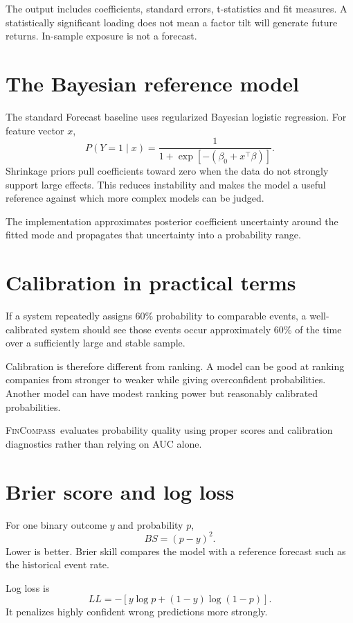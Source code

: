 \documentclass[11pt]{article}
\newcommand{\FC}{\textsc{FinCompass}}
\begin{document}
The output includes coefficients, standard errors, t-statistics and fit measures. A statistically significant loading does not mean a factor tilt will generate future returns. In-sample exposure is not a forecast.

\section{The Bayesian reference model}
The standard Forecast baseline uses regularized Bayesian logistic regression. For feature vector $x$,
\begin{equation}
P(Y=1\mid x)=\frac{1}{1+\exp[-(\beta_0+x^\top\beta)]}.
\end{equation}
Shrinkage priors pull coefficients toward zero when the data do not strongly support large effects. This reduces instability and makes the model a useful reference against which more complex models can be judged.

The implementation approximates posterior coefficient uncertainty around the fitted mode and propagates that uncertainty into a probability range.

\section{Calibration in practical terms}
If a system repeatedly assigns 60\% probability to comparable events, a well-calibrated system should see those events occur approximately 60\% of the time over a sufficiently large and stable sample.

Calibration is therefore different from ranking. A model can be good at ranking companies from stronger to weaker while giving overconfident probabilities. Another model can have modest ranking power but reasonably calibrated probabilities.

\FC\ evaluates probability quality using proper scores and calibration diagnostics rather than relying on AUC alone.

\section{Brier score and log loss}
For one binary outcome $y$ and probability $p$,
\begin{equation}
BS=(p-y)^2.
\end{equation}
Lower is better. Brier skill compares the model with a reference forecast such as the historical event rate.

Log loss is
\begin{equation}
LL=-[y\log p+(1-y)\log(1-p)].
\end{equation}
It penalizes highly confident wrong predictions more strongly.
\end{document}
